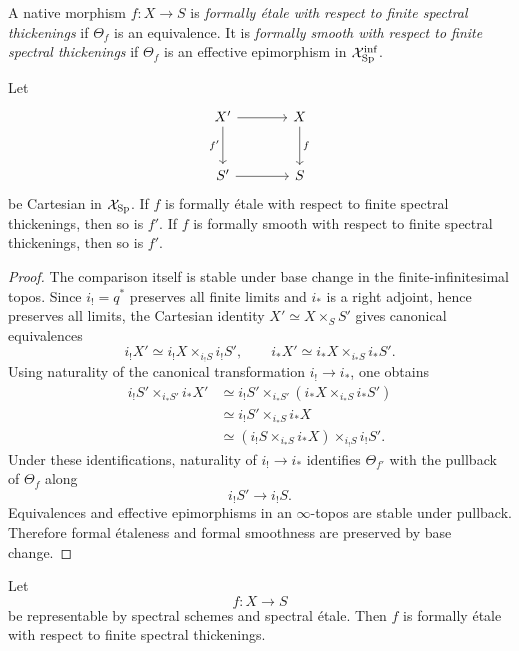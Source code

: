 \begin{definition}
\label{def:infinitesimal-formal-smooth-etale}
A native morphism $f:X\to S$ is \emph{formally \'etale with respect to finite
spectral thickenings} if $\Theta_f$ is an equivalence.  It is
\emph{formally smooth with respect to finite spectral thickenings} if
$\Theta_f$ is an effective epimorphism in
$\mathcal X_{\mathrm{Sp}}^{\mathrm{inf}}$.
\end{definition}

\begin{proposition}
\label{prop:infinitesimal-formal-base-change}
Let
\[
\begin{tikzcd}[column sep=large,row sep=large]
    X' \ar[r] \ar[d,"f'"'] & X \ar[d,"f"]\\
    S' \ar[r] & S
\end{tikzcd}
\]
be Cartesian in $\mathcal X_{\mathrm{Sp}}$.  If $f$ is formally \'etale with respect
to finite spectral thickenings, then so is $f'$.  If $f$ is formally smooth
with respect to finite spectral thickenings, then so is $f'$.
\end{proposition}

\begin{proof}
The comparison itself is stable under base change in the finite-infinitesimal
topos.  Since $i_!=q^*$ preserves all finite limits and $i_*$ is a right
adjoint, hence preserves all limits, the Cartesian identity
$X'\simeq X\times_SS'$ gives canonical equivalences
\[
    i_!X'\simeq i_!X\times_{i_!S}i_!S',
    \qquad
    i_*X'\simeq i_*X\times_{i_*S}i_*S'.
\]
Using naturality of the canonical transformation $i_!\to i_*$, one obtains
\[
\begin{aligned}
    i_!S'\times_{i_*S'}i_*X'
    &\simeq
    i_!S'\times_{i_*S'}
    \left(i_*X\times_{i_*S}i_*S'\right)\\
    &\simeq
    i_!S'\times_{i_*S}i_*X\\
    &\simeq
    \left(i_!S\times_{i_*S}i_*X\right)
    \times_{i_!S}i_!S'.
\end{aligned}
\]
Under these identifications, naturality of $i_!\to i_*$ identifies
$\Theta_{f'}$ with the pullback of $\Theta_f$ along
\[
    i_!S'\longrightarrow i_!S.
\]
Equivalences and effective epimorphisms in an $\infty$-topos are stable under
pullback.  Therefore formal \'etaleness and formal smoothness are preserved by
base change.
\end{proof}

\begin{theorem}
\label{thm:infinitesimal-etale-formally-etale}
Let
\[
    f:X\longrightarrow S
\]
be representable by spectral schemes and spectral \'etale.  Then $f$ is
formally \'etale with respect to finite spectral thickenings.
\end{theorem}

